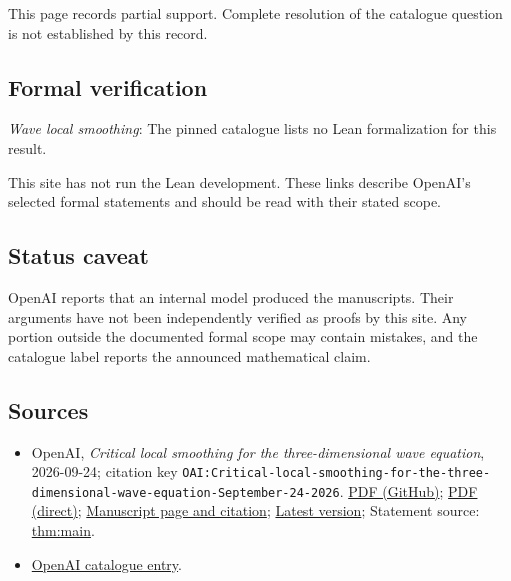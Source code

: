 \documentclass[11pt]{article}
\begin{document}
This page records partial support. Complete resolution of the catalogue question is not established by this record.

\subsection{Formal verification}
\textit{Wave local smoothing}: The pinned catalogue lists no Lean formalization for this result.

This site has not run the Lean development. These links describe OpenAI’s selected formal statements and should be read with their stated scope.

\subsection{Status caveat}
OpenAI reports that an internal model produced the manuscripts. Their arguments have not been independently verified as proofs by this site. Any portion outside the documented formal scope may contain mistakes, and the catalogue label reports the announced mathematical claim.

\subsection{Sources}
\begin{itemize}
\item OpenAI, \emph{Critical local smoothing for the three-dimensional wave equation}, 2026-09-24; citation key \texttt{OAI:Critical-local-smoothing-for-the-three-dimensional-wave-equation-September-24-2026}. \href{https://github.com/openai/math/blob/adc7f1241b42e322a6451854ab7e4b4c146bf78a/preprints/Critical-local-smoothing-for-the-three-dimensional-wave-equation-September-24-2026/paper.pdf}{PDF (GitHub)}; \href{https://github.com/openai/math/raw/adc7f1241b42e322a6451854ab7e4b4c146bf78a/preprints/Critical-local-smoothing-for-the-three-dimensional-wave-equation-September-24-2026/paper.pdf}{PDF (direct)}; \href{https://github.com/openai/math/blob/adc7f1241b42e322a6451854ab7e4b4c146bf78a/preprints/Critical-local-smoothing-for-the-three-dimensional-wave-equation-September-24-2026/README.md}{Manuscript page and citation}; \href{https://github.com/openai/math/blob/main/preprints/Critical-local-smoothing-for-the-three-dimensional-wave-equation-September-24-2026/paper.pdf}{Latest version}; Statement source: \href{https://github.com/openai/math/blob/adc7f1241b42e322a6451854ab7e4b4c146bf78a/preprints/Critical-local-smoothing-for-the-three-dimensional-wave-equation-September-24-2026/build/sections/00-introduction.tex\#L25}{thm:main}.
\item \href{https://github.com/openai/math/blob/adc7f1241b42e322a6451854ab7e4b4c146bf78a/CONTENTS.md}{OpenAI catalogue entry}.
\end{itemize}
\end{document}
